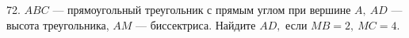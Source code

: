72. $ABC$ --- прямоугольный треугольник с прямым углом при вершине $A,\ AD$ --- высота треугольника, $AM$ --- биссектриса. Найдите $AD,$ если $MB=2,\ MC=4.$\\
